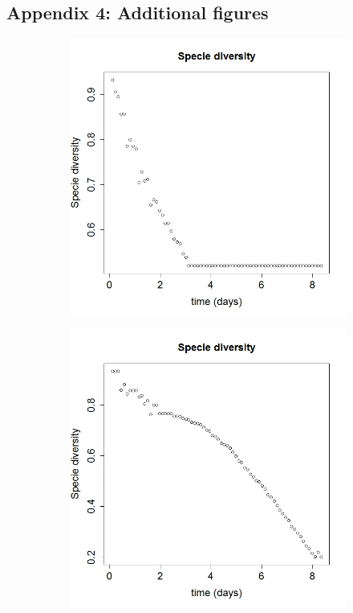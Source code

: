 \begin{acknowledgements}
\section*{Appendix 4: Additional figures}
\begin{figure}[!ht] 
\begin{subfigure}[b]{.5\textwidth}
\includegraphics[width=1\textwidth]{p2/s274}
\end{subfigure}\hspace*{-1.5em}
\centering
\begin{subfigure}[b]{.5\textwidth}
\includegraphics[width=1\textwidth]{p2/s278}%

\end{subfigure}
\end{figure}
\end{acknowledgements}
